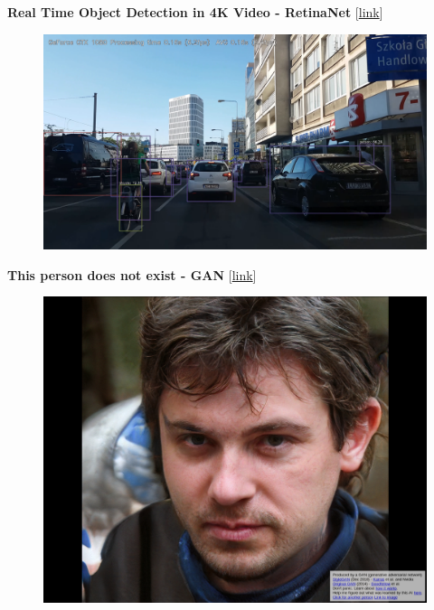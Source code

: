 \documentclass[10pt, compress]{beamer}
\begin{document}
\begin{frame}
  \vspace{.6cm}
  \textbf{Real Time Object Detection in 4K Video - RetinaNet} [\href{https://www.youtube.com/watch?v=KYueHEMGRos}{link}] \\

  \vspace{.6cm}
  \begin{figure}
    \includegraphics[width=.9\linewidth]{imgs/news/4k-retinanet}
  \end{figure}
\end{frame}

\begin{frame}
  \vspace{.6cm}
  \textbf{This person does not exist - GAN} [\href{https://thispersondoesnotexist.com/}{link}] \\

  \vspace{.6cm}
  \begin{figure}
    \includegraphics[width=.75\linewidth]{imgs/news/person}
  \end{figure}
\end{frame}
\end{document}

